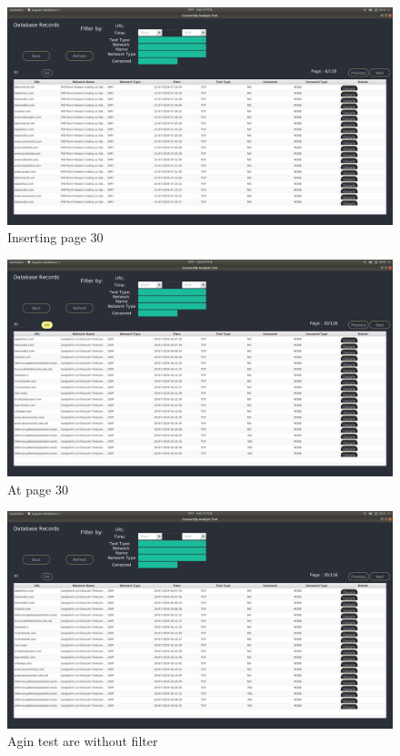 \begin{figure}[h]
    \centering
    \includegraphics[width=\textwidth]{usersite/2pageinput.png}
    \caption{Inserting page 30}
    \label{fig:user2}
\end{figure}

\begin{figure}[h]
    \centering
    \includegraphics[width=\textwidth]{usersite/3pageoutput.png}
    \caption{At page 30}
    \label{fig:user3}
\end{figure}

\begin{figure}[h]
    \centering
    \includegraphics[width=\textwidth]{usersite/4withoutfilter.png}
    \caption{Agin test are without filter}
    \label{fig:user4}
\end{figure}

